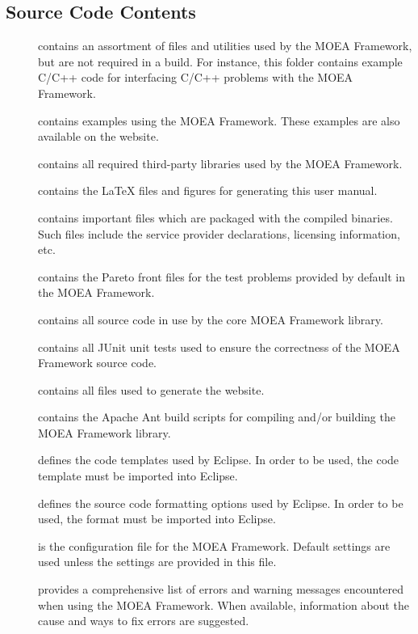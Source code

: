 \subsection{Source Code Contents}
\begin{description}
  \item[] contains an assortment of files and utilities used by the MOEA Framework, but are not required in a build.  For instance, this folder contains example C/C++ code for interfacing C/C++ problems with the MOEA Framework.
  \item[] contains examples using the MOEA Framework.  These examples are also available on the website.
  \item[] contains all required third-party libraries used by the MOEA Framework.
  \item[] contains the LaTeX files and figures for generating this user manual.
  \item[] contains important files which are packaged with the compiled binaries.  Such files include the service provider declarations, licensing information, etc.
  \item[] contains the Pareto front files for the test problems provided by default in the MOEA Framework.
  \item[] contains all source code in use by the core MOEA Framework library.
  \item[] contains all JUnit unit tests used to ensure the correctness of the MOEA Framework source code.
  \item[] contains all files used to generate the website.
  \item[] contains the Apache Ant build scripts for compiling and/or building the MOEA Framework library.
  \item[] defines the code templates used by Eclipse.  In order to be used, the code template must be imported into Eclipse.
  \item[] defines the source code formatting options used by Eclipse.  In order to be used, the format must be imported into Eclipse.
  \item[] is the configuration file for the MOEA Framework.  Default settings are used unless the settings are provided in this file.
  \item[] provides a comprehensive list of errors and warning messages encountered when using the MOEA Framework.  When available, information about the cause and ways to fix errors are suggested.

\end{description}
